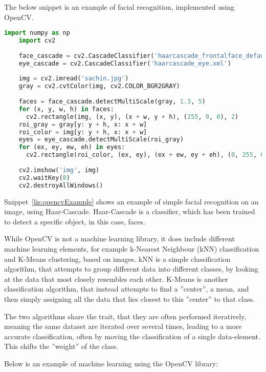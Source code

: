 The below snippet is an example of facial recognition, implemented using OpenCV.
\begin{lstlisting}[language=Python,label=lis:opencvExample,caption=Source code from the OpenCV documentation\cite{opencvHaarExample}.]
	import numpy as np
	import cv2
	
	face_cascade = cv2.CascadeClassifier('haarcascade_frontalface_default.xml')
	eye_cascade = cv2.CascadeClassifier('haarcascade_eye.xml')
	
	img = cv2.imread('sachin.jpg')
	gray = cv2.cvtColor(img, cv2.COLOR_BGR2GRAY)
	
	faces = face_cascade.detectMultiScale(gray, 1.3, 5)
	for (x, y, w, h) in faces:
	  cv2.rectangle(img, (x, y), (x + w, y + h), (255, 0, 0), 2)
	roi_gray = gray[y: y + h, x: x + w]
	roi_color = img[y: y + h, x: x + w]
	eyes = eye_cascade.detectMultiScale(roi_gray)
	for (ex, ey, ew, eh) in eyes:
	  cv2.rectangle(roi_color, (ex, ey), (ex + ew, ey + eh), (0, 255, 0), 2)
	
	cv2.imshow('img', img)
	cv2.waitKey(0)
	cv2.destroyAllWindows()
\end{lstlisting}
Snippet~\ref{lis:opencvExample} shows an example of simple facial recognition on an image, using Haar-Cascade.
Haar-Cascade is a classifier, which has been trained to detect a specific object, in this case, faces.

While OpenCV is not a machine learning library, it does include different machine learning elements, for example k-Nearest Neighbour (kNN) classification and K-Means clustering, based on images.
kNN is a simple classification algorithm, that attempts to group different data into different classes, by looking at the data that most closely resembles each other.
K-Means is another classification algorithm, that instead attempts to find a ''center'', a mean, and then simply assigning all the data that lies closest to this ''center'' to that class.

The two algorithms share the trait, that they are often performed iteratively, meaning the same dataset are iterated over several times, leading to a more accurate classification, often by moving the classification of a single data-element.
This shifts the ''weight'' of the class.

Below is an example of machine learning using the OpenCV library:

